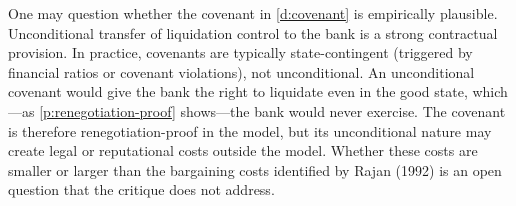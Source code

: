 \documentclass[12pt,a4paper]{article}
\theoremstyle{plain}
\theoremstyle{definition}
\theoremstyle{remark}
\begin{document}
One may question whether the covenant in \cref{d:covenant} is empirically plausible. Unconditional transfer of liquidation control to the bank is a strong contractual provision. In practice, covenants are typically state-contingent (triggered by financial ratios or covenant violations), not unconditional. An unconditional covenant would give the bank the right to liquidate even in the good state, which---as \cref{p:renegotiation-proof} shows---the bank would never exercise. The covenant is therefore renegotiation-proof in the model, but its unconditional nature may create legal or reputational costs outside the model. Whether these costs are smaller or larger than the bargaining costs identified by Rajan (1992) is an open question that the critique does not address.
\end{document}
